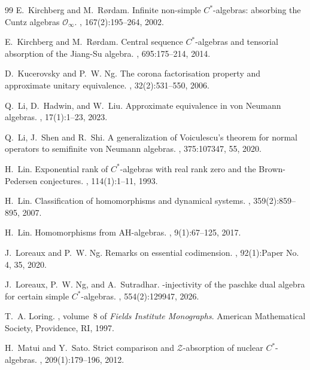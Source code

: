 \documentclass[reqno]{amsart}
\theoremstyle{definition}
\theoremstyle{remark}
\numberwithin{equation}{section}
\theoremstyle{definition}
\begin{document}
\begin{thebibliography}{99}
E.~Kirchberg and M.~R{\o}rdam.
\newblock Infinite non-simple {$C^*$}-algebras: absorbing the {C}untz algebras
  {$\mathcal O_\infty$}.
, 167(2):195--264, 2002.

E.~Kirchberg and M.~R{\o}rdam.
\newblock Central sequence {$C^*$}-algebras and tensorial absorption of the
  {J}iang-{S}u algebra.
, 695:175--214, 2014.

D.~Kucerovsky and P.~W. Ng.
\newblock The corona factorisation property and approximate unitary
  equivalence.
, 32(2):531--550, 2006.

Q.~Li, D.~Hadwin, and W.~Liu.
\newblock Approximate equivalence in von {N}eumann algebras.
, 17(1):1--23, 2023. 

Q.~Li, J.~Shen and R.~Shi. 
\newblock A generalization of Voiculescu’s theorem for normal operators to semifinite von Neumann algebras. 
, 375:107347, 55, 2020.

H.~Lin. 
\newblock Exponential rank of {$C^*$}-algebras with real rank zero and the
  {B}rown-{P}edersen conjectures.
, 114(1):1--11, 1993.

H.~Lin.
\newblock Classification of homomorphisms and dynamical systems.
, 359(2):859--895, 2007.

H.~Lin.
\newblock Homomorphisms from {AH}-algebras.
, 9(1):67--125, 2017.

J.~Loreaux and P.~W. Ng.
\newblock Remarks on essential codimension.
, 92(1):Paper No. 4, 35,
  2020.

J.~Loreaux, P.~W. Ng, and A.~Sutradhar. 
-injectivity of the paschke dual algebra for certain simple {$C^*$}-algebras. 
, 554(2):129947, 2026. 

T.~A. Loring.
,
  volume~8 of {\em Fields Institute Monographs}.
\newblock American Mathematical Society, Providence, RI, 1997.

H.~Matui and Y.~Sato.
\newblock Strict comparison and {$\mathcal{Z}$}-absorption of nuclear
  {$C^*$}-algebras.
, 209(1):179--196, 2012.


\end{thebibliography}
\end{document}
